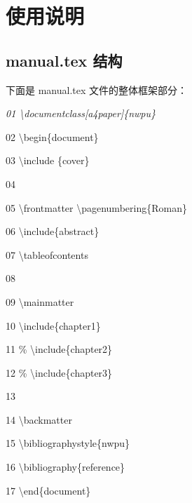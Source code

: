 \documentclass{nwpu}
\begin{document}
    \chapter{使用说明}
        \section{manual.tex 结构}
            下面是 manual.tex 文件的整体框架部分：
                \vskip 10pt
                \hskip 1cm
                \begin{minipage}[t]{8cm}
                    \it
                    01 \qquad\textbackslash documentclass[a4paper]\{nwpu\}   \par
                    02 \qquad\textbackslash begin\{document\}                \par
                    03 \qquad\textbackslash include \{cover\}                \par
                    04 \                                               \par
                    05 \qquad\textbackslash frontmatter  \qquad\textbackslash pagenumbering\{Roman\} \par
                    06 \qquad\textbackslash include\{abstract\}              \par
                    07 \qquad\textbackslash tableofcontents                  \par
                    08 \                                               \par
                    09 \qquad\textbackslash mainmatter                       \par
                    10 \qquad\textbackslash include\{chapter1\}              \par
                    11 \qquad\% \textbackslash include\{chapter2\}           \par
                    12 \qquad\% \textbackslash include\{chapter3\}           \par
                    13 \                                               \par
                    14 \qquad\textbackslash backmatter                       \par
                    15 \qquad\textbackslash bibliographystyle\{nwpu\}        \par
                    16 \qquad\textbackslash bibliography\{reference\}        \par
                    17 \qquad\textbackslash end\{document\}                  \par
                \end{minipage}
\end{document}
